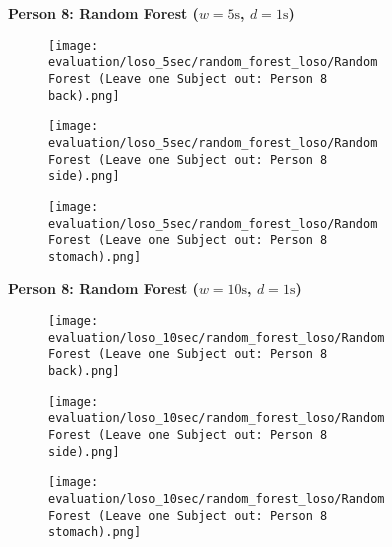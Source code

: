 \begin{figure}
    \textbf{Person 8: Random Forest ($w=5\si{\s}$, $d=1\si{\s}$)}
      \centering
      \begin{subfigure}{1\textwidth}
          \texttt{[image: evaluation/loso\_5sec/random\_forest\_loso/Random Forest (Leave one Subject out: Person 8 back).png]}
        \end{subfigure}
        \begin{subfigure}{1\textwidth}
          \texttt{[image: evaluation/loso\_5sec/random\_forest\_loso/Random Forest (Leave one Subject out: Person 8 side).png]}
        \end{subfigure}
        \begin{subfigure}{1\textwidth}
          \texttt{[image: evaluation/loso\_5sec/random\_forest\_loso/Random Forest (Leave one Subject out: Person 8 stomach).png]}
      \end{subfigure}
        \textbf{Person 8: Random Forest ($w=10\si{\s}$, $d=1\si{\s}$)}
      \centering
      \begin{subfigure}{1\textwidth}
          \texttt{[image: evaluation/loso\_10sec/random\_forest\_loso/Random Forest (Leave one Subject out: Person 8 back).png]}
        \end{subfigure}
        \begin{subfigure}{1\textwidth}
          \texttt{[image: evaluation/loso\_10sec/random\_forest\_loso/Random Forest (Leave one Subject out: Person 8 side).png]}
        \end{subfigure}
        \begin{subfigure}{1\textwidth}
          \texttt{[image: evaluation/loso\_10sec/random\_forest\_loso/Random Forest (Leave one Subject out: Person 8 stomach).png]}
      \end{subfigure}
  
      \label{evaluation:random_forest_loso:person8}
\end{figure}
